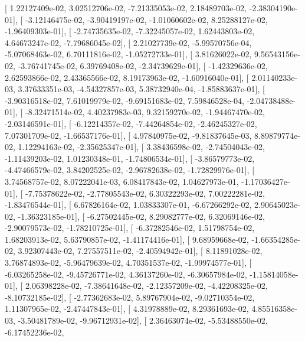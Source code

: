 \documentclass{article}
\begin{document}
       [  1.22127409e-02,   3.02512706e-02,  -7.21335053e-02,
          2.18489703e-02,  -2.38304190e-01],
       [ -3.12146475e-02,  -3.90419197e-02,  -1.01060602e-02,
          8.25288127e-02,  -1.96409303e-01],
       [ -2.74735635e-02,  -7.32245057e-02,   1.62443803e-02,
          4.64673247e-02,  -7.79686045e-02],
       [  2.21027739e-02,  -5.99570756e-04,  -5.07068463e-02,
          6.70111816e-02,  -1.05272733e-01],
       [  3.81626022e-02,   9.56543156e-02,  -3.76741745e-02,
          6.39769408e-02,  -2.34739629e-01],
       [ -1.42329636e-02,   2.62593866e-02,   2.43365566e-02,
          8.19173963e-02,  -1.60916040e-01],
       [  2.01140233e-03,   3.37633351e-03,  -4.54327857e-03,
          5.38732940e-04,  -1.85883637e-01],
       [ -3.90316518e-02,   7.61019979e-02,  -9.69151683e-02,
          7.59846528e-04,  -2.04738488e-01],
       [ -8.32471514e-02,   4.40237983e-03,   9.32159270e-02,
         -1.94467470e-02,  -2.03146591e-01],
       [ -6.12214357e-02,  -7.44264854e-02,  -2.46245327e-02,
          7.07301709e-02,  -1.66537176e-01],
       [  4.97840975e-02,  -9.81837645e-03,   8.89879774e-02,
          1.12294163e-02,  -2.35625347e-01],
       [  3.38436598e-02,  -2.74504043e-02,  -1.11439203e-02,
          1.01230348e-01,  -1.74806534e-01],
       [ -3.86579773e-02,  -4.47466579e-02,   3.84202525e-02,
         -2.96782638e-02,  -1.72829976e-01],
       [  3.74568757e-02,   8.07222041e-03,   6.08417843e-02,
          1.04627973e-01,  -1.17036427e-01],
       [ -7.75378622e-02,  -2.77805543e-02,   6.30322293e-02,
          7.00222281e-02,  -1.83476544e-01],
       [  6.67826164e-02,   1.03833307e-01,  -6.67266292e-02,
          2.90645023e-02,  -1.36323185e-01],
       [ -6.27502445e-02,   8.29082777e-02,   6.32069146e-02,
         -2.90079573e-02,  -1.78210725e-01],
       [ -6.37282546e-02,   1.51798754e-02,   1.68203913e-02,
          5.63790857e-02,  -1.41174416e-01],
       [  9.68959668e-02,  -1.66354285e-02,   3.92307443e-02,
          7.27557511e-02,  -2.40594942e-01],
       [  8.11891028e-02,   3.76874893e-02,  -5.96479639e-02,
          4.70351537e-02,  -1.99974577e-01],
       [ -6.03265258e-02,  -9.45726771e-02,   4.36137260e-02,
         -6.30657984e-02,  -1.15814058e-01],
       [  2.06398228e-02,  -7.38641648e-02,  -2.12357209e-02,
         -4.42208325e-02,  -8.10732185e-02],
       [ -2.77362683e-02,   5.89767904e-02,  -9.02710354e-02,
          1.11307965e-02,  -2.47447843e-01],
       [  4.31978889e-02,   8.29361693e-02,   4.85516358e-03,
         -3.50481789e-02,  -9.96712931e-02],
       [  2.36463074e-02,  -5.53488550e-02,  -6.17452236e-02,
\end{document}
